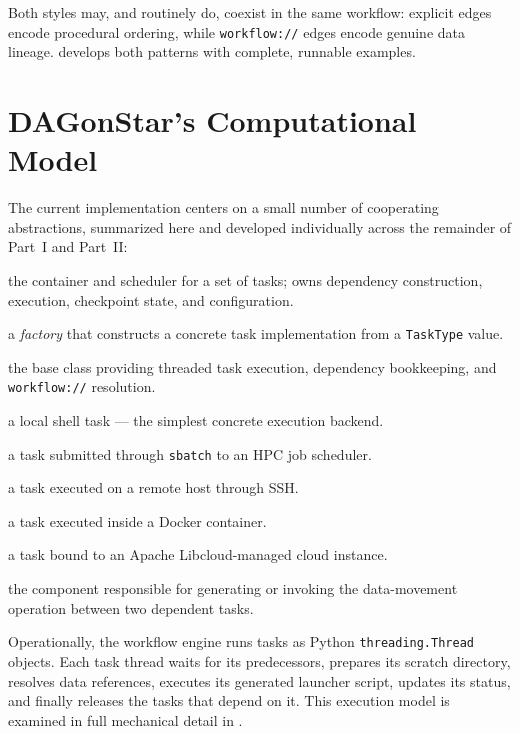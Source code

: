 Both styles may, and routinely do, coexist in the same workflow: explicit
edges encode procedural ordering, while \texttt{workflow://} edges encode
genuine data lineage.  develops both patterns with
complete, runnable examples.

\section{DAGonStar's Computational Model}
\label{sec:computational-model}

The current implementation centers on a small number of cooperating
abstractions, summarized here and developed individually across the
remainder of Part~I and Part~II:

\begin{description}[leftmargin=2.2em,style=nextline]
  \item[\texttt{Workflow}] the container and scheduler for a set of tasks;
    owns dependency construction, execution, checkpoint state, and
    configuration.
  \item[\texttt{DagonTask}] a \emph{factory} that constructs a concrete task
    implementation from a \texttt{TaskType} value.
  \item[\texttt{Task}] the base class providing threaded task execution,
    dependency bookkeeping, and \texttt{workflow://} resolution.
  \item[\texttt{Batch}] a local shell task --- the simplest concrete
    execution backend.
  \item[\texttt{Slurm}] a task submitted through \texttt{sbatch} to an HPC
    job scheduler.
  \item[\texttt{RemoteTask}] a task executed on a remote host through SSH.
  \item[\texttt{DockerTask}] a task executed inside a Docker container.
  \item[\texttt{CloudTask}] a task bound to an Apache Libcloud-managed cloud
    instance.
  \item[\texttt{Stager}] the component responsible for generating or
    invoking the data-movement operation between two dependent tasks.
\end{description}

Operationally, the workflow engine runs tasks as Python \texttt{threading.Thread}
objects. Each task thread waits for its predecessors, prepares its scratch
directory, resolves data references, executes its generated launcher script,
updates its status, and finally releases the tasks that depend on it. This
execution model is examined in full mechanical detail in
.

